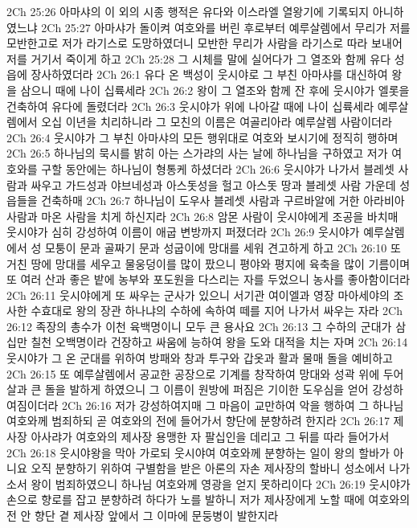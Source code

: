2Ch 25:26  아마샤의 이 외의 시종 행적은 유다와 이스라엘 열왕기에 기록되지 아니하였느냐
2Ch 25:27  아마샤가 돌이켜 여호와를 버린 후로부터 예루살렘에서 무리가 저를 모반한고로 저가 라기스로 도망하였더니 모반한 무리가 사람을 라기스로 따라 보내어 저를 거기서 죽이게 하고
2Ch 25:28  그 시체를 말에 실어다가 그 열조와 함께 유다 성읍에 장사하였더라
2Ch 26:1  유다 온 백성이 웃시야로 그 부친 아마샤를 대신하여 왕을 삼으니 때에 나이 십륙세라
2Ch 26:2  왕이 그 열조와 함께 잔 후에 웃시야가 엘롯을 건축하여 유다에 돌렸더라
2Ch 26:3  웃시야가 위에 나아갈 때에 나이 십륙세라 예루살렘에서 오십 이년을 치리하니라 그 모친의 이름은 여골리아라 예루살렘 사람이더라
2Ch 26:4  웃시야가 그 부친 아마샤의 모든 행위대로 여호와 보시기에 정직히 행하며
2Ch 26:5  하나님의 묵시를 밝히 아는 스가랴의 사는 날에 하나님을 구하였고 저가 여호와를 구할 동안에는 하나님이 형통케 하셨더라
2Ch 26:6  웃시야가 나가서 블레셋 사람과 싸우고 가드성과 야브네성과 아스돗성을 헐고 아스돗 땅과 블레셋 사람 가운데 성읍들을 건축하매
2Ch 26:7  하나님이 도우사 블레셋 사람과 구르바알에 거한 아라비아 사람과 마온 사람을 치게 하신지라
2Ch 26:8  암몬 사람이 웃시야에게 조공을 바치매 웃시야가 심히 강성하여 이름이 애굽 변방까지 퍼졌더라
2Ch 26:9  웃시야가 예루살렘에서 성 모퉁이 문과 골짜기 문과 성굽이에 망대를 세워 견고하게 하고
2Ch 26:10  또 거친 땅에 망대를 세우고 물웅덩이를 많이 팠으니 평야와 평지에 육축을 많이 기름이며 또 여러 산과 좋은 밭에 농부와 포도원을 다스리는 자를 두었으니 농사를 좋아함이더라
2Ch 26:11  웃시야에게 또 싸우는 군사가 있으니 서기관 여이엘과 영장 마아세야의 조사한 수효대로 왕의 장관 하나냐의 수하에 속하여 떼를 지어 나가서 싸우는 자라
2Ch 26:12  족장의 총수가 이천 육백명이니 모두 큰 용사요
2Ch 26:13  그 수하의 군대가 삼십만 칠천 오백명이라 건장하고 싸움에 능하여 왕을 도와 대적을 치는 자며
2Ch 26:14  웃시야가 그 온 군대를 위하여 방패와 창과 투구와 갑옷과 활과 물매 돌을 예비하고
2Ch 26:15  또 예루살렘에서 공교한 공장으로 기계를 창작하여 망대와 성곽 위에 두어 살과 큰 돌을 발하게 하였으니 그 이름이 원방에 퍼짐은 기이한 도우심을 얻어 강성하여짐이더라
2Ch 26:16  저가 강성하여지매 그 마음이 교만하여 악을 행하여 그 하나님 여호와께 범죄하되 곧 여호와의 전에 들어가서 향단에 분향하려 한지라
2Ch 26:17  제사장 아사랴가 여호와의 제사장 용맹한 자 팔십인을 데리고 그 뒤를 따라 들어가서
2Ch 26:18  웃시야왕을 막아 가로되 웃시야여 여호와께 분향하는 일이 왕의 할바가 아니요 오직 분향하기 위하여 구별함을 받은 아론의 자손 제사장의 할바니 성소에서 나가소서 왕이 범죄하였으니 하나님 여호와께 영광을 얻지 못하리이다
2Ch 26:19  웃시야가 손으로 향로를 잡고 분향하려 하다가 노를 발하니 저가 제사장에게 노할 때에 여호와의 전 안 향단 곁 제사장 앞에서 그 이마에 문둥병이 발한지라
